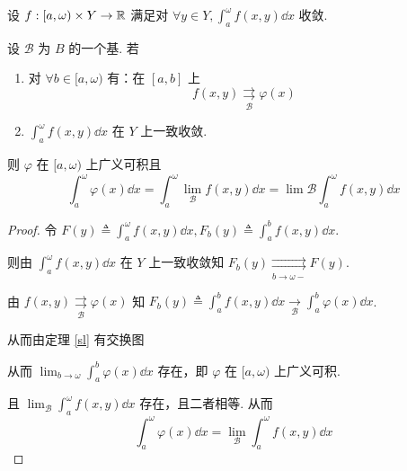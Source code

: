 \begin{property}
    设 $f:[a,\omega)\times Y\to\mathbb{R}$ 满足对 $\forall y\in Y,\displaystyle\int_a^\omega f(x,y)\dd x$ 收敛.

    设 $\mathcal{B}$ 为 $B$ 的一个基. 若

    \begin{enumerate}
        \item 对 $\forall b\in[a,\omega)$ 有：在 $[a,b]$ 上
$$
f(x,y)\underset{\mathcal{B}}{\rightrightarrows}{\varphi(x)}
$$

        \item $\int_a^\omega f(x,y)\dd x$ 在 $Y$ 上一致收敛.
    \end{enumerate}

    则 $\varphi$ 在 $[a,\omega)$ 上广义可积且
$$
\int_a^\omega\varphi(x)\dd x=\int_a^\omega\lim_{\mathcal{B}}f(x,y)\dd x=\lim{\mathcal{B}}\int_a^\omega f(x,y)\dd x
$$
\end{property}
\begin{proof}
    令 $F(y)\triangleq\displaystyle\int_a^\omega f(x,y)\dd x,F_b(y)\triangleq\int_a^bf(x,y)\dd x$.

    则由 $\displaystyle\int_a^\omega f(x,y)\dd x$ 在 $Y$ 上一致收敛知 $F_b(y)\underset{b\to\omega-}{\rightrightarrows} F(y)$.

    由 $f(x,y)\underset{\mathcal{B}}{\rightrightarrows}\varphi(x)$ 知 $F_b(y)\triangleq\int_a^bf(x,y)\dd x\xrightarrow[\mathcal{B}]{}\int_a^b\varphi(x)\dd x$.

    从而由定理 \ref{sl} 有交换图
    
    \begin{center}
    \end{center}

    从而 $\displaystyle\lim_{b\to\omega}\int_a^b\varphi(x)\dd x$ 存在，即 $\varphi$ 在 $[a,\omega)$ 上广义可积.

    且 $\displaystyle\lim_{\mathcal{B}}\int_a^\omega f(x,y)\dd x$ 存在，且二者相等. 从而
$$
\int_a^\omega\varphi(x)\dd x=\lim_{\mathcal{B}}\int_a^\omega f(x,y)\dd x
$$
\end{proof}